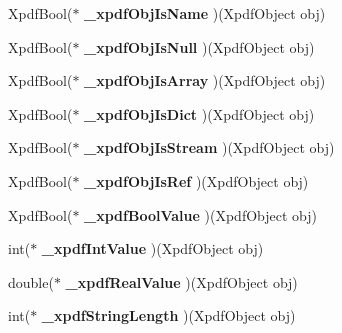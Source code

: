 \begin{DoxyCompactItemize}
Xpdf\+Bool($\ast$ {\bfseries \+\_\+xpdf\+Obj\+Is\+Name} )(Xpdf\+Object obj)
\item 
\mbox{\label{struct_xpdf_plugin_vec_table_a6dfc113eb06b3b0e1c8730df6fdd6bf1}} 
Xpdf\+Bool($\ast$ {\bfseries \+\_\+xpdf\+Obj\+Is\+Null} )(Xpdf\+Object obj)
\item 
\mbox{\label{struct_xpdf_plugin_vec_table_ae7b3a18b5cd4c9adf1ed77fdffed5c8a}} 
Xpdf\+Bool($\ast$ {\bfseries \+\_\+xpdf\+Obj\+Is\+Array} )(Xpdf\+Object obj)
\item 
\mbox{\label{struct_xpdf_plugin_vec_table_abc6c050cb3c0a5964d2bf5eee4a53281}} 
Xpdf\+Bool($\ast$ {\bfseries \+\_\+xpdf\+Obj\+Is\+Dict} )(Xpdf\+Object obj)
\item 
\mbox{\label{struct_xpdf_plugin_vec_table_a92222378a9b68086f88e7b49301577bc}} 
Xpdf\+Bool($\ast$ {\bfseries \+\_\+xpdf\+Obj\+Is\+Stream} )(Xpdf\+Object obj)
\item 
\mbox{\label{struct_xpdf_plugin_vec_table_af7424cb3ab2331aeaf4d32242911e38d}} 
Xpdf\+Bool($\ast$ {\bfseries \+\_\+xpdf\+Obj\+Is\+Ref} )(Xpdf\+Object obj)
\item 
\mbox{\label{struct_xpdf_plugin_vec_table_ace1d7461b9aed6ff3cbd231e76a9e7a8}} 
Xpdf\+Bool($\ast$ {\bfseries \+\_\+xpdf\+Bool\+Value} )(Xpdf\+Object obj)
\item 
\mbox{\label{struct_xpdf_plugin_vec_table_aecfc9b56c3361b43c74c7f171123272c}} 
int($\ast$ {\bfseries \+\_\+xpdf\+Int\+Value} )(Xpdf\+Object obj)
\item 
\mbox{\label{struct_xpdf_plugin_vec_table_a227bc0f1ca66ac7b599bee0d326fd361}} 
double($\ast$ {\bfseries \+\_\+xpdf\+Real\+Value} )(Xpdf\+Object obj)
\item 
\mbox{\label{struct_xpdf_plugin_vec_table_a1539257927bcf1d487c6825e5a4ccf9a}} 
int($\ast$ {\bfseries \+\_\+xpdf\+String\+Length} )(Xpdf\+Object obj)
\item 

\end{DoxyCompactItemize}
